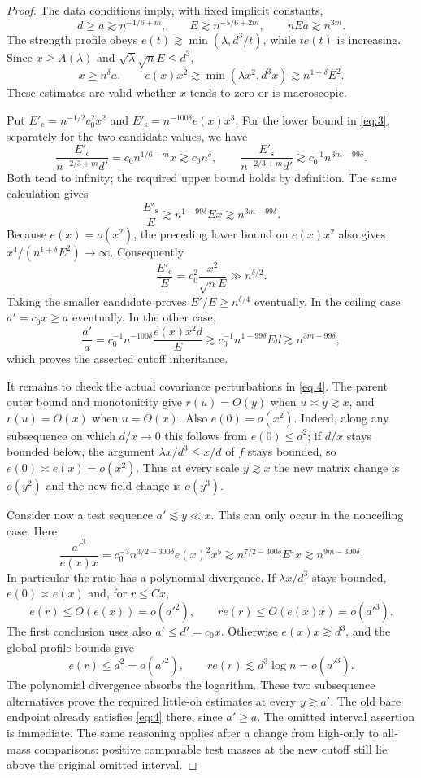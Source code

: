 \begin{proof}
The data conditions imply, with fixed implicit constants,
\[
 d\ge a\gtrsim n^{-1/6+m},\qquad
 E\gtrsim n^{-5/6+2m},\qquad nEa\gtrsim n^{3m}.
\]
The strength profile obeys $e(t)\gtrsim
\min(\lambda,d^3/t)$, while $te(t)$ is increasing.  Since
$x\ge A(\lambda)$ and $\sqrt\lambda\sqrt n E\le d^3$,
\[
 x\ge n^\delta a,\qquad
 e(x)x^2\gtrsim
 \min(\lambda x^2,d^3x)\gtrsim n^{1+\delta}E^2.
\]
These estimates are valid whether $x$ tends to zero or is macroscopic.

Put $E'_{\mathrm c}=n^{-1/2}c_0^2x^2$ and
$E'_{\mathrm s}=n^{-100\delta}e(x)x^3$.  For the lower bound in
\eqref{eq:3}, separately for the two candidate values, we have
\[
 \frac{E'_{\mathrm c}}{n^{-2/3+m}d'}
   =c_0 n^{1/6-m}x\gtrsim c_0n^\delta,
 \qquad
 \frac{E'_{\mathrm s}}{n^{-2/3+m}d'}
   \gtrsim c_0^{-1}n^{3m-99\delta}.
\]
Both tend to infinity; the required upper bound holds by definition.
The same calculation gives
\[
 \frac{E'_{\mathrm s}}E
 \gtrsim n^{1-99\delta}Ex\gtrsim n^{3m-99\delta}.
\]
Because $e(x)=o(x^2)$, the preceding lower bound on $e(x)x^2$
also gives $x^4/(n^{1+\delta}E^2)\to\infty$.  Consequently
\[
 \frac{E'_{\mathrm c}}E
     =c_0^2\frac{x^2}{\sqrt n E}
     \gg n^{\delta/2}.
\]
Taking the smaller candidate proves $E'/E\ge n^{\delta/4}$
eventually.  In the ceiling case $a'=c_0x\ge a$ eventually.
In the other case,
\[
 \frac{a'}a
 =c_0^{-1}n^{-100\delta}\frac{e(x)x^2d}E
 \gtrsim c_0^{-1}n^{1-99\delta}Ed
 \gtrsim n^{3m-99\delta},
\]
which proves the asserted cutoff inheritance.

It remains to check the actual covariance perturbations in
\eqref{eq:4}.  The parent outer bound and monotonicity give
$r(u)=O(y)$ when $u\asymp y\gtrsim x$, and $r(u)=O(x)$ when
$u=O(x)$.  Also $e(0)=o(x^2)$.  Indeed, along any subsequence on
which $d/x\to0$ this follows from $e(0)\le d^2$; if $d/x$ stays
bounded below, the argument $\lambda x/d^3\le x/d$ of $f$ stays
bounded, so $e(0)\asymp e(x)=o(x^2)$.  Thus at every scale
$y\gtrsim x$ the new matrix change is $o(y^2)$ and the new field
change is $o(y^3)$.

Consider now a test sequence $a'\lesssim y\ll x$.  This can only
occur in the nonceiling case.  Here
\[
 \frac{a'^3}{e(x)x}
 =c_0^{-3}n^{3/2-300\delta}e(x)^2x^5
 \gtrsim n^{7/2-300\delta}E^4x
 \gtrsim n^{9m-300\delta}.
\]
In particular the ratio has a polynomial divergence.  If
$\lambda x/d^3$ stays bounded, $e(0)\asymp e(x)$ and, for
$r\le Cx$,
\[
 e(r)\le O(e(x))=o(a'^2),\qquad re(r)\le O(e(x)x)=o(a'^3).
\]
The first conclusion uses also $a'\le d'=c_0x$.  Otherwise
$e(x)x\gtrsim d^3$, and the global profile bounds give
\[
 e(r)\le d^2=o(a'^2),\qquad
 re(r)\lesssim d^3\log n=o(a'^3).
\]
The polynomial divergence absorbs the logarithm.  These two
subsequence alternatives prove the required little-oh estimates at
every $y\gtrsim a'$.  The old bare endpoint already satisfies
\eqref{eq:4} there, since $a'\ge a$.  The omitted interval assertion
is immediate.  The same reasoning applies after a change from
high-only to all-mass comparisons: positive comparable test masses
at the new cutoff still lie above the original omitted interval.
\end{proof}

